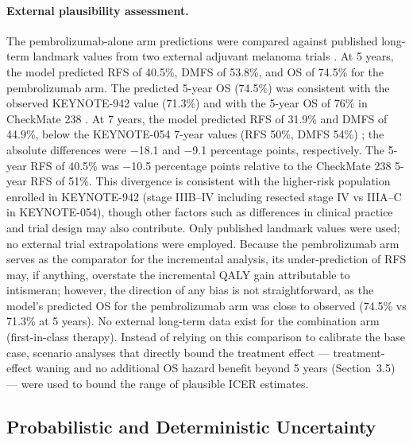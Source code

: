 \documentclass[12pt,a4paper]{article}
\begin{document}
\paragraph{External plausibility assessment.} The \mbox{pembrolizumab}-alone arm predictions were compared against published long-term landmark values from two external adjuvant melanoma trials \cite{eggermont2025,ascierto2025}. At 5 years, the model predicted RFS of 40.5\%, DMFS of 53.8\%, and OS of 74.5\% for the \mbox{pembrolizumab} arm. The predicted 5-year OS (74.5\%) was consistent with the observed \mbox{KEYNOTE-942} value (71.3\%) and with the 5-year OS of 76\% in CheckMate 238 \cite{ascierto2023}. At 7 years, the model predicted RFS of 31.9\% and DMFS of 44.9\%, below the KEYNOTE-054 7-year values (RFS 50\%, DMFS 54\%) \cite{eggermont2025}; the absolute differences were $-$18.1 and $-$9.1 percentage points, respectively. The 5-year RFS of 40.5\% was $-$10.5 percentage points relative to the CheckMate 238 5-year RFS of 51\%. This divergence is consistent with the higher-risk population enrolled in \mbox{KEYNOTE-942} (stage IIIB--IV including resected stage IV vs IIIA--C in KEYNOTE-054), though other factors such as differences in clinical practice and trial design may also contribute. Only published landmark values were used; no external trial extrapolations were employed. Because the \mbox{pembrolizumab} arm serves as the comparator for the incremental analysis, its under-prediction of RFS may, if anything, overstate the incremental QALY gain attributable to intismeran; however, the direction of any bias is not straightforward, as the model's predicted OS for the \mbox{pembrolizumab} arm was close to observed (74.5\% vs 71.3\% at 5 years). No external long-term data exist for the combination arm (first-in-class therapy). Instead of relying on this comparison to calibrate the base case, scenario analyses that directly bound the treatment effect --- treatment-effect waning and no additional OS hazard benefit beyond 5 years (Section~3.5) --- were used to bound the range of plausible ICER estimates.



\subsection{Probabilistic and Deterministic Uncertainty}
\end{document}
